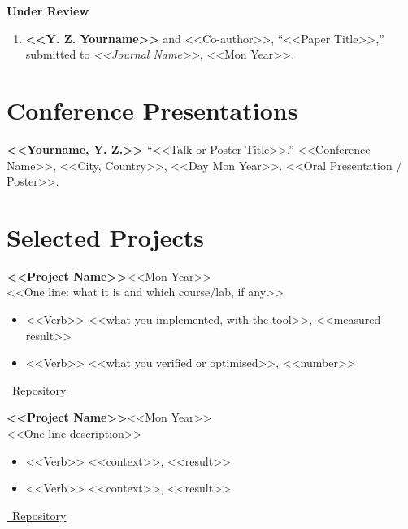 \documentclass[a4paper,10pt]{article}
\newcommand{\entry}[2]{\textbf{#1}\hfill{#2}\\}
\begin{document}
\vspace{4pt}
\textbf{Under Review}
\begin{enumerate}[leftmargin=1.4em, itemsep=3pt, resume]
  \item \textbf{<<Y. Z. Yourname>>} and <<Co-author>>,
        ``<<Paper Title>>,'' submitted to \textit{<<Journal Name>>}, <<Mon Year>>.
\end{enumerate}


\section{Conference Presentations}
\textbf{<<Yourname, Y. Z.>>} ``<<Talk or Poster Title>>.'' <<Conference Name>>,
<<City, Country>>, <<Day Mon Year>>. <<Oral Presentation / Poster>>.

\section{Selected Projects}

\entry{<<Project Name>>}{<<Mon Year>>}
<<One line: what it is and which course/lab, if any>>
\begin{itemize}
  \item <<Verb>> <<what you implemented, with the tool>>, <<measured result>>
  \item <<Verb>> <<what you verified or optimised>>, <<number>>
\end{itemize}
\href{<<repo url>>}{\faGithub\ Repository}

\vspace{5pt}
\entry{<<Project Name>>}{<<Mon Year>>}
<<One line description>>
\begin{itemize}
  \item <<Verb>> <<context>>, <<result>>
  \item <<Verb>> <<context>>, <<result>>
\end{itemize}
\href{<<repo url>>}{\faGithub\ Repository}
\end{document}

